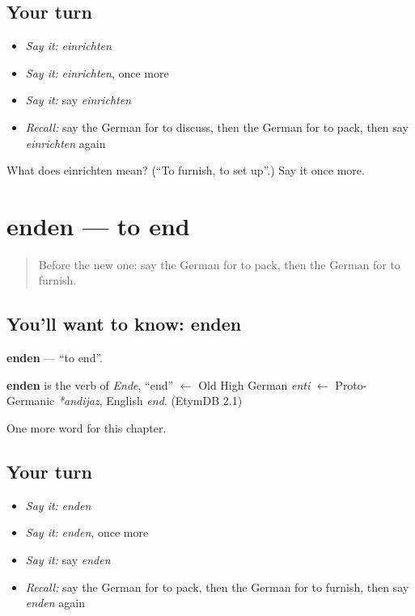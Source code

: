 \subsection*{Your turn}
\begin{itemize}
\raggedright
  \item \emph{Say it:} \emph{einrichten}
  \item \emph{Say it:} \emph{einrichten}, once more
  \item \emph{Say it:} say \emph{einrichten}
  \item \emph{Recall:} say the German for to discuss, then the German for to pack, then say \emph{einrichten} again
\end{itemize}

\begin{tcolorbox}[breakable,colback=teal!4,colframe=teal!35!black,title={Before you move on}]
What does einrichten mean? (\textquotedblleft{}To furnish, to set up\textquotedblright{}.) Say it once more.
\end{tcolorbox}
\section[enden]{enden — to end}

\label{lesson:GE-C248-enden}



\begin{quote}
Before the new one: say the German for to pack, then the German for to furnish.
\end{quote}

\subsection*{You'll want to know: enden}
\textbf{enden} — \textquotedblleft{}to end\textquotedblright{}.

\begin{cousinweb}
\textbf{enden} is the verb of \emph{Ende}, \textquotedblleft{}end\textquotedblright{} $\leftarrow$ Old High German \emph{enti} $\leftarrow$ Proto-Germanic \emph{*andijaz}, English \emph{end}. (EtymDB 2.1)
\end{cousinweb}

\begin{grammarlens}[title={What you've built}]
One more word for this chapter.
\end{grammarlens}

\subsection*{Your turn}
\begin{itemize}
\raggedright
  \item \emph{Say it:} \emph{enden}
  \item \emph{Say it:} \emph{enden}, once more
  \item \emph{Say it:} say \emph{enden}
  \item \emph{Recall:} say the German for to pack, then the German for to furnish, then say \emph{enden} again
\end{itemize}

